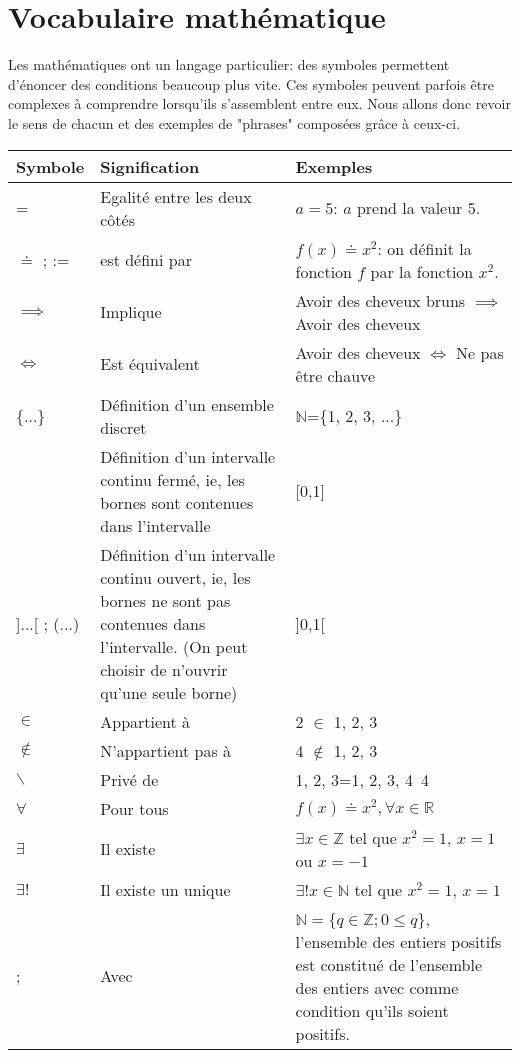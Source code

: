 \documentclass[oneside,12pt,french,table]{book}
\theoremstyle{definition}
\theoremstyle{plain}
\theoremstyle{remark}
\newcommand{\Nn}{{\mathbb{N}}}
\newcommand{\Zz}{{\mathbb{Z}}}
\newcommand{\Rr}{{\mathbb{R}}}
\begin{document}
\section{Vocabulaire mathématique}

Les mathématiques ont un langage particulier: des symboles permettent d'énoncer des conditions beaucoup plus vite. Ces symboles peuvent parfois être complexes à comprendre lorsqu'ils s'assemblent entre eux. Nous allons donc revoir le sens de chacun et des exemples de "phrases" composées grâce à ceux-ci.



\begin{center}
\begin{tabular}{|m{1.5cm} |m{8cm}| m{6.5cm}|} 
 \hline
 Symbole & Signification & Exemples\\ [0.5ex] 
 \hline
 = & Egalité entre les deux côtés & $a=5$: $a$ prend la valeur 5.  \\ 
 \hline
 $\doteq$ ; := & est défini par & $f(x)\doteq x^2$: on définit la fonction $f$ par la fonction $x^2$.  \\
 \hline
 $\implies$ & Implique & Avoir des cheveux bruns $\implies$ Avoir des cheveux \\
 \hline
 $\iff$ & Est équivalent & Avoir des cheveux $\iff$ Ne pas être chauve\\
 \hline
 \{...\} & Définition d'un ensemble discret & $\Nn$=\{1, 2, 3, ...\}  \\
 \hline
 [...] & Définition d'un intervalle continu fermé, ie, les bornes sont contenues dans l'intervalle & [0,1]  \\
 \hline
 ]...[ ; (...)& Définition d'un intervalle continu ouvert, ie, les bornes ne sont pas contenues dans l'intervalle. (On peut choisir de n'ouvrir qu'une seule borne) & ]0,1[  \\
 \hline
  $\in$ & Appartient à & 2 $\in$ {1, 2, 3} \\
 \hline
 $\notin$ & N'appartient pas à & 4 $\notin$ {1, 2, 3} \\
 \hline
 
 $\backslash$ & Privé de & {1, 2, 3}={1, 2, 3, 4}\ {4} \\
 \hline
 $\forall $ & Pour tous & $f(x)\doteq x^2, \forall x\in \Rr$\\

 \hline
 $\exists$ & Il existe  & $\exists x \in \Zz $ tel que $x^2=1$, $x=1$ ou $x=-1$\\
 \hline
 $\exists !$ & Il existe un unique & $\exists ! x \in \Nn$ tel que $x^2=1$, $x=1$ \\
 \hline
 ;& Avec & $\Nn=\{q\in \Zz ;  0\leq q\}$, l'ensemble des entiers positifs est constitué de l'ensemble des entiers avec comme condition qu'ils soient positifs.\\
 \hline
 \end{tabular}
\end{center}
\end{document}
